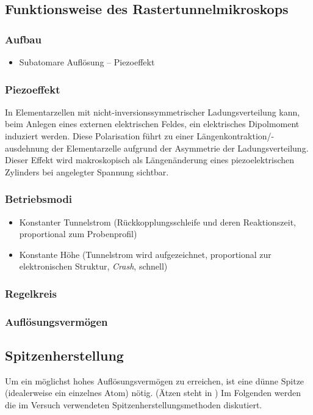 \documentclass[10pt, a4paper]{article}
\begin{document}
\subsection{Funktionsweise des Rastertunnelmikroskops}
\subsubsection{Aufbau}
\begin{itemize}
  \item Subatomare Auflösung -- Piezoeffekt
\end{itemize}
\subsubsection{Piezoeffekt}
In Elementarzellen mit nicht-inversionssymmetrischer Ladungsverteilung kann, beim Anlegen eines externen elektrischen Feldes, ein elektrisches Dipolmoment induziert werden.
Diese Polarisation führt zu einer Längenkontraktion/-ausdehnung der Elementarzelle aufgrund der Asymmetrie der Ladungsverteilung.
Dieser Effekt wird makroskopisch als Längenänderung eines piezoelektrischen Zylinders bei angelegter Spannung sichtbar.

\subsubsection{Betriebsmodi}
\begin{itemize}
  \item Konstanter Tunnelstrom (Rückkopplungsschleife und deren Reaktionszeit, proportional zum Probenprofil)
  \item Konstante Höhe (Tunnelstrom wird aufgezeichnet, proportional zur elektronischen Struktur, \emph{Crash}, schnell)
\end{itemize}

\subsubsection{Regelkreis}
\subsubsection{Auflösungsvermögen}

\subsection{Spitzenherstellung}
Um ein möglichst hohes Auflösungsvermögen zu erreichen, ist eine dünne Spitze (idealerweise ein einzelnes Atom) nötig. (Ätzen steht in \cite{colton})
Im Folgenden werden die im Versuch verwendeten Spitzenherstellungsmethoden diskutiert.
\end{document}
